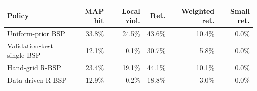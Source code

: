 \begin{tabular}{lrrrrr}
\toprule
Policy & MAP hit & Local viol. & Ret. & Weighted ret. & Small ret. \\
\midrule
Uniform-prior BSP & 33.8\% & 24.5\% & 43.6\% & 10.4\% & 0.0\% \\
Validation-best single BSP & 12.1\% & 0.1\% & 30.7\% & 5.8\% & 0.0\% \\
Hand-grid R-BSP & 23.4\% & 19.1\% & 44.1\% & 10.1\% & 0.0\% \\
Data-driven R-BSP & 12.9\% & 0.2\% & 18.8\% & 3.0\% & 0.0\% \\
\bottomrule
\end{tabular}

